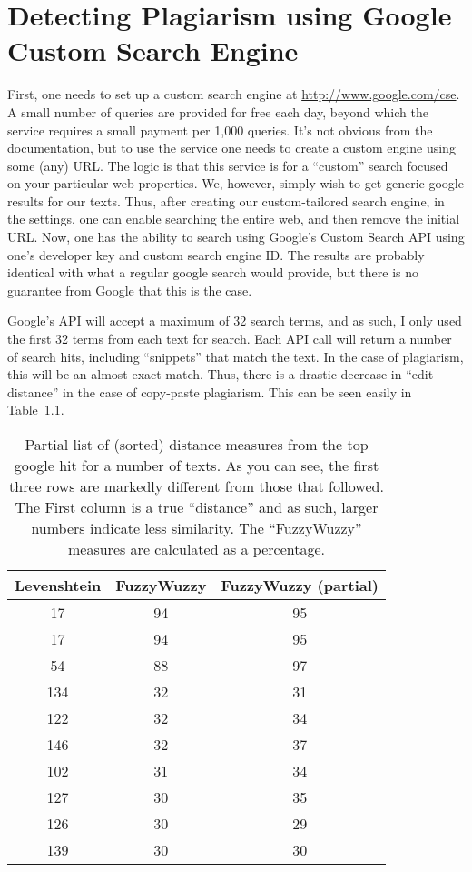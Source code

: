 \chapter{Detecting Plagiarism using Google Custom Search Engine}
\label{app:detecting-plagiarism}


First, one needs to set up a custom search engine at
\url{http://www.google.com/cse}. A small number of queries are provided for free
each day, beyond which the service requires a small payment per 1,000 queries.
It's not obvious from the documentation, but to use the service one needs to
create a custom engine using some (any) URL. The logic is that this service is
for a “custom” search focused on your particular web properties. We, however,
simply wish to get generic google results for our texts. Thus, after creating
our custom-tailored search engine, in the settings, one can enable searching the
entire web, and then remove the initial URL.  Now, one has the ability to
search using Google's Custom Search API using one's developer key and custom
search engine ID. The results are probably identical with what a regular google
search would provide, but there is no guarantee from Google that this is the
case.

Google's API will accept a maximum of 32 search terms, and as such, I only used
the first 32 terms from each text for search. Each API call will return a number
of search hits, including “snippets” that match the text. In the case of
plagiarism, this will be an almost exact match. Thus, there is a drastic
decrease in “edit distance” in the case of copy-paste plagiarism. This can be
seen easily in Table~\ref{tab:plag-dists}.

\begin{table}
    \caption{Partial list of (sorted) distance measures from the top google hit for a
        number of texts. As you can see, the first three rows are markedly
        different from those that followed. The First column is a true
        “distance” and as such, larger numbers indicate less similarity. The
        “FuzzyWuzzy” measures are calculated as a percentage.}
    \label{tab:plag-dists}
    \centering
    \begin{tabular}{ccc}
        \toprule
        Levenshtein & FuzzyWuzzy & FuzzyWuzzy (partial) \\ 
        \midrule
        17	&  94	& 95 \\
        17	&  94	& 95 \\
        54	&  88	& 97 \\
        134	&  32	& 31 \\
        122	&  32	& 34 \\
        146	&  32	& 37 \\
        102	&  31	& 34 \\
        127	&  30	& 35 \\
        126	&  30	& 29 \\
        139	&  30	& 30 \\
        \bottomrule
    \end{tabular}
\end{table}

